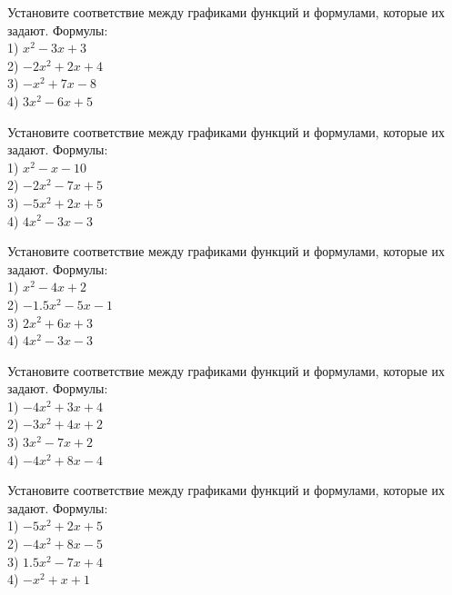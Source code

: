 \documentclass[4apaper]{article}
\begin{document}
\begin{taskBN}{12}
Установите соответствие между графиками функций и формулами, которые их задают. Формулы: \\1) $x^2-3x+3$\\2) $-2x^2+2x+4$\\3) $-x^2+7x-8$\\4) $3x^2-6x+5$
\end{taskBN}

\begin{taskBN}{13}
Установите соответствие между графиками функций и формулами, которые их задают. Формулы: \\1) $x^2-x-10$\\2) $-2x^2-7x+5$\\3) $-5x^2+2x+5$\\4) $4x^2-3x-3$
\end{taskBN}

\begin{taskBN}{14}
Установите соответствие между графиками функций и формулами, которые их задают. Формулы: \\1) $x^2-4x+2$\\2) $-1.5x^2-5x-1$\\3) $2x^2+6x+3$\\4) $4x^2-3x-3$
\end{taskBN}

\begin{taskBN}{15}
Установите соответствие между графиками функций и формулами, которые их задают. Формулы: \\1) $-4x^2+3x+4$\\2) $-3x^2+4x+2$\\3) $3x^2-7x+2$\\4) $-4x^2+8x-4$
\end{taskBN}

\begin{taskBN}{16}
Установите соответствие между графиками функций и формулами, которые их задают. Формулы: \\1) $-5x^2+2x+5$\\2) $-4x^2+8x-5$\\3) $1.5x^2-7x+4$\\4) $-x^2+x+1$
\end{taskBN}
\end{document}
